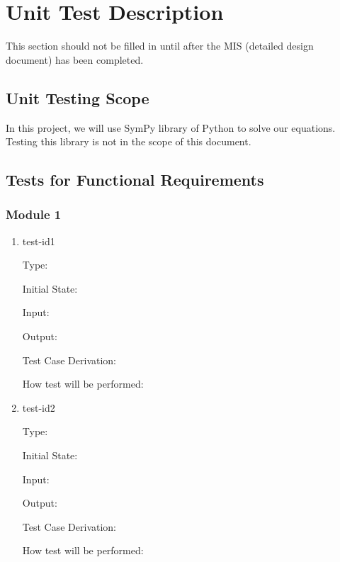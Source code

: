 \documentclass[12pt, titlepage]{article}
\begin{document}
\section{Unit Test Description} \label{sec_unitest}

This section should not be filled in until after the MIS (detailed design   document) has been completed.

\subsection{Unit Testing Scope}
In this project, we will use SymPy library of Python to solve our equations. Testing this library is not in the scope of this document.


\subsection{Tests for Functional Requirements}


\subsubsection{Module 1}


\begin{enumerate}

\item{test-id1\\}

Type: 
					
Initial State: 
					
Input: 
					
Output: 

Test Case Derivation: 

How test will be performed: 
					
\item{test-id2\\}

Type: 
					
Initial State: 
					
Input: 
					
Output: 

Test Case Derivation: 

How test will be performed: 

    
\end{enumerate}
\end{document}
